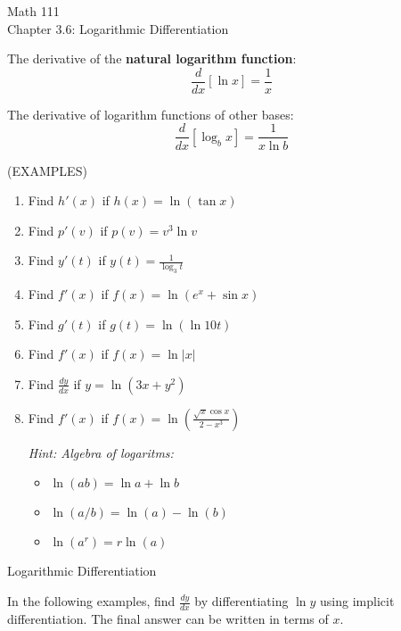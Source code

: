 \documentclass[11pt]{article}
\begin{document}
\begin{center}
\Large
\rm{Math 111}
\\
\rm{Chapter 3.6:  Logarithmic Differentiation}
\\
\end{center}
\vspace{0.2in}

The derivative of the {\bf natural logarithm function}:
\begin{displaymath}
  \frac{d}{dx}\left[\ln{x}  \right] = \frac{1}{x} 
  \end{displaymath}

\vspace{0.6in}

The derivative of logarithm functions of other bases:
\begin{displaymath}
  \frac{d}{dx}\left[\log_b{x}  \right] = \frac{1}{x\ln{b}} 
  \end{displaymath}

\vspace{0.6in}



  (EXAMPLES)
\begin{enumerate}
\item{Find $h'(x)$ if $h(x) = \ln{(\tan{x})}$}
  \vspace{1in}
\item{Find $p'(v)$ if $p(v)=v^3\ln{v}$}
    \vspace{1in}
  \item{Find $y'(t)$ if $y(t) = \frac{1}{\log_3{t}}$}
    \vspace{1.2in}
  \item{Find $f'(x)$ if $f(x) = \ln{(e^x+\sin{x})}$}
    \vspace{1.2in}
  \item{Find $g'(t)$ if $g(t) = \ln{(\ln{10t})}$}
    \vspace{1.2in}
  \item{Find $f'(x)$ if $f(x) = \ln{|x|}$}
    \vspace{2in}
  \item{Find $\frac{dy}{dx}$ if $y= \ln{(3x+y^2)}$}
    \vspace{2in}
  \item{Find $f'(x)$ if $f(x) = \ln{\left(\frac{\sqrt{x}\cos{x}}{2-x^3}\right)}$

    \vspace{0.1in}
    \emph{Hint:  Algebra of logaritms:}

    \begin{itemize}
    \item{$\ln{(ab)} = \ln{a} + \ln{b}$}
    \item{$\ln{(a/b)} = \ln(a) - \ln(b)$}
    \item{$\ln{(a^r)} = r\ln(a)$}
      \end{itemize}
  }
    \pagebreak


      \end{enumerate}
    \begin{center}
\Large
\rm{Logarithmic Differentiation}
\end{center}
In the following examples, find $\frac{dy}{dx}$ by differentiating $\ln{y}$ using implicit differentiation.  The final answer can be written in terms of $x$.
\end{document}
